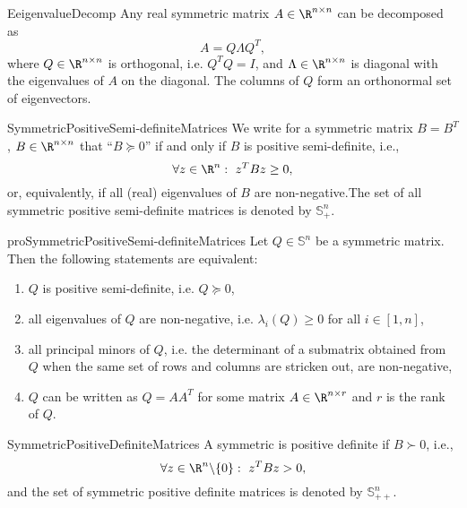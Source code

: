 \newpage

\begin{theo}{EeigenvalueDecomp}
    Any real symmetric matrix $A \in \R^{n \times n}$ can be decomposed as
    \begin{equation*}
        A = Q \Lambda Q^T,
    \end{equation*}
    where $Q \in \R^{n \times n}$ is orthogonal, i\@.e\@. $Q^T Q = I$, and $\Lambda \in \R^{n \times n}$ is diagonal with the eigenvalues of $A$ on the diagonal. The columns of $Q$ form an orthonormal set of eigenvectors.
\end{theo}

\begin{theo}{SymmetricPositiveSemi-definiteMatrices}
    We write for a symmetric matrix $B = B^T$, $B \in \R^{n \times n}$ that ``$B \succeq 0$'' if and only if $B$ is positive semi-definite, i\@.e\@., 
    \begin{equation*}
        \forall z \in \R^n: \ z^T B z \geq 0,
    \end{equation*}
    or, equivalently, if all (real) eigenvalues of $B$ are non-negative.The set of all symmetric positive semi-definite matrices is denoted by $\mathbb{S}^n_+$. 
\end{theo}

\begin{pro}{proSymmetricPositiveSemi-definiteMatrices}
    Let $Q \in \mathbb{S}^n$ be a symmetric matrix. Then the following statements are equivalent:
    \begin{enumerate}
        \item $Q$ is positive semi-definite, i\@.e\@. $Q \succeq 0$,
        \item all eigenvalues of $Q$ are non-negative, i\@.e\@. $\lambda_i(Q) \geq 0$ for all $i \in [1,n]$,
        \item all principal minors of $Q$, i\@.e\@. the determinant of a submatrix obtained from $Q$ when the same set of rows and columns are stricken out, are non-negative,
        \item $Q$ can be written as $Q = AA^T$ for some matrix $A \in \R^{n \times r}$ and $r$ is the rank of $Q$.
    \end{enumerate}
    \vspace*{-0.3cm}
\end{pro}

\begin{theo}{SymmetricPositiveDefiniteMatrices}
    A symmetric is positive definite if $B \succ 0$, i\@.e\@.,
    \begin{equation*}
        \forall z \in \R^n \backslash \{0\}: \ z^T B z > 0,
    \end{equation*}
    and the set of symmetric positive definite matrices is denoted by $\mathbb{S}^n_{++}$.
\end{theo}

